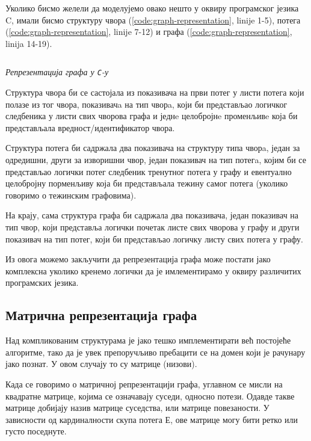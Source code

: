 \par
Уколико бисмо желели да моделујемо овако нешто у оквиру програмског језика C, имали бисмо структуру чвора (\ref{code:graph-representation}, linije 1-5), потега (\ref{code:graph-representation}, linije 7-12) и графа (\ref{code:graph-representation}, linija 14-19).

\begin{listing}[!ht]
\inputminted{c}{kodovi/graph.c}
\caption{\textit{Репрезентација графа у \texttt{C}-у}}
\label{code:graph-representation}
\end{listing}

Структура чвора би се састојала из показивача на први потег у листи потега који полазе из тог чвора, показивачa на тип чворa, који би представљао логичког следбеника у листи свих чворова графа и једнe целобројнe променљивe која би представљала вредност/идентификатор чвора.

\par
Структура потега би садржала два показивача на структуру типа чворa, један за одредишни, други за изворишни чвор, један показивач на тип потегa, којим би се представљао логички потег следбеник тренутног потега у графу и евентуално целобројну порменљиву која би представљала тежину самог потега (уколико говоримо о тежинским графовима).

\par
На крају, сама структура графа би садржала два показивача, један показивач на тип чвор, који представља логички почетак листе свих чворова у графу и други показивач на тип потег, који би представљао логичку листу свих потега у графу.

\par
Из овога можемо закључити да репрезентација графа може постати јако комплексна уколико кренемо логички да је имлементирамо у оквиру различитих програмских језика.

\subsection{Матрична репрезентација графа}
Над компликованим структурама је јако тешко имплементирати већ постојеће алгоритме, тако да је увек препоручљиво пребацити се на домен који је рачунару јако познат. У овом случају то су матрице (низови).

\par
Када се говоримо о матричној репрезентацији графа, углавном се мисли на квадратне матрице, којима се означавају суседи, односно потези. Одавде такве матрице добијају назив матрице суседства, или матрице повезаности. У зависности од кардиналности скупа потега $Е$, ове матрице могу бити ретко или густо поседнуте. 

